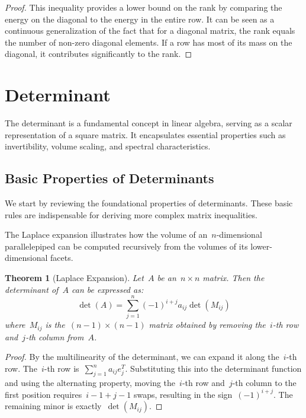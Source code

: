 \documentclass[12pt]{article}
\newtheorem{theorem}{Theorem}[section]
\begin{document}
\begin{proof}
This inequality provides a lower bound on the rank by comparing the energy on the diagonal to the energy in the entire row. It can be seen as a continuous generalization of the fact that for a diagonal matrix, the rank equals the number of non-zero diagonal elements. If a row has most of its mass on the diagonal, it contributes significantly to the rank.
\end{proof}

\section{Determinant}
The determinant is a fundamental concept in linear algebra, serving as a scalar representation of a square matrix. It encapsulates essential properties such as invertibility, volume scaling, and spectral characteristics.

\subsection{Basic Properties of Determinants}
We start by reviewing the foundational properties of determinants. These basic rules are indispensable for deriving more complex matrix inequalities.

\noindent The Laplace expansion illustrates how the volume of an~$n$-dimensional parallelepiped can be computed recursively from the volumes of its lower-dimensional facets.
\begin{theorem}[Laplace Expansion]
Let~$A$ be an~$n \times n$ matrix. Then the determinant of~$A$ can be expressed as:
\[ \det(A) = \sum_{j=1}^{n} (-1)^{i+j} a_{ij} \det(M_{ij}) \]
where~$M_{ij}$ is the~$(n - 1) \times (n - 1)$ matrix obtained by removing the~$i$-th row and~$j$-th column from~$A$.
\end{theorem}
\begin{proof}
By the multilinearity of the determinant, we can expand it along the~$i$-th row. The~$i$-th row is~$\sum_{j=1}^n a_{ij} e_j^T$. Substituting this into the determinant function and using the alternating property, moving the~$i$-th row and~$j$-th column to the first position requires~$i-1 + j-1$ swaps, resulting in the sign~$(-1)^{i+j}$. The remaining minor is exactly~$\det(M_{ij})$.
\end{proof}
\end{document}
